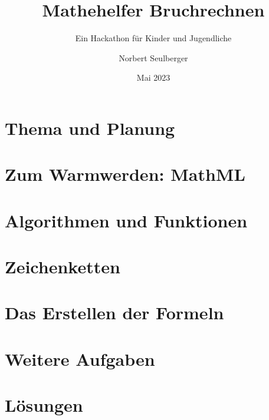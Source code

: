\documentclass[12p,numbers=noendperiod,DIV=15]{scrreprt}
\begin{document}
	
\title{Mathehelfer Bruchrechnen}
\subtitle{Ein Hackathon für Kinder und Jugendliche}
\author{Norbert Seulberger}
\date{Mai 2023}

\maketitle

\tableofcontents

\chapter{Thema und Planung}







\chapter{Zum Warmwerden: MathML}




\chapter{Algorithmen und Funktionen}








\chapter{Zeichenketten}



\chapter{Das Erstellen der Formeln}





\chapter{Weitere Aufgaben}








\chapter{Lösungen}




\end{document}
